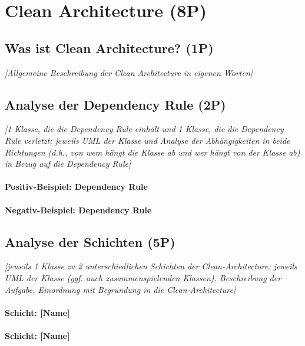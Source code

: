 
\titlespacing*{\chapter}{0pt}{-30mm}{10pt}
  
\chapter{Clean Architecture (8P)}
\pagestyle{scrheadings}
\clearscrheadfoot
{}
\setcounter{page}{2}
\ofoot[\pagemark]{\pagemark}
\onehalfspacing

\section{Was ist Clean Architecture? (1P)}
\emph{[Allgemeine Beschreibung der Clean Architecture in eigenen Worten]}

\section{Analyse der Dependency Rule (2P)}
\emph{[1 Klasse, die die Dependency Rule einhält und 1 Klasse, die die Dependency Rule verletzt; jeweils
UML der Klasse und Analyse der Abhängigkeiten in beide Richtungen (d.h., von wem hängt die Klasse
ab und wer hängt von der Klasse ab) in Bezug auf die Dependency Rule]}

\subsubsection{Positiv-Beispiel: Dependency Rule}
\subsubsection{Negativ-Beispiel: Dependency Rule}

\section{Analyse der Schichten (5P)}
\emph{[jeweils 1 Klasse zu 2 unterschiedlichen Schichten der Clean-Architecture: jeweils UML der Klasse
(ggf. auch zusammenspielenden Klassen), Beschreibung der Aufgabe, Einordnung mit Begründung in
die Clean-Architecture]}

\subsubsection{Schicht: [Name]}
\subsubsection{Schicht: [Name]}